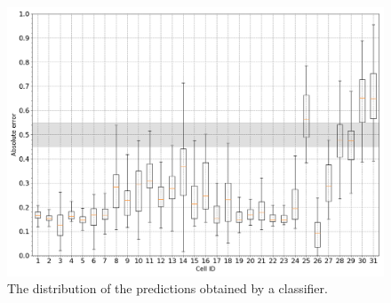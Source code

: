 \documentclass{article}
\begin{document}
%



\begin{figure}[b]
\begin{minipage}[b]{1.0\linewidth}
    \centering
    \centerline{\includegraphics[width=1\linewidth]{paperImages/r3.png}}
\end{minipage}
\caption[fig2]{The distribution of the predictions obtained by a classifier.} 
\end{figure}
\end{document}
